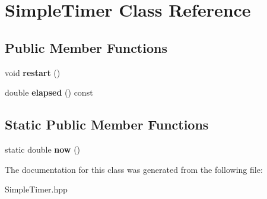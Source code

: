 \hypertarget{classSimpleTimer}{
\section{SimpleTimer Class Reference}
\label{classSimpleTimer}
}
\subsection*{Public Member Functions}
\begin{DoxyCompactItemize}
\item 
\hypertarget{classSimpleTimer_ab46a9a774391760865df2d1c88d777cc}{
void {\bfseries restart} ()}
\label{classSimpleTimer_ab46a9a774391760865df2d1c88d777cc}

\item 
\hypertarget{classSimpleTimer_af4319404e506317898cce1d17b61be32}{
double {\bfseries elapsed} () const }
\label{classSimpleTimer_af4319404e506317898cce1d17b61be32}

\end{DoxyCompactItemize}
\subsection*{Static Public Member Functions}
\begin{DoxyCompactItemize}
\item 
\hypertarget{classSimpleTimer_a29a1e9d827950cb2471b15da06c0d1d1}{
static double {\bfseries now} ()}
\label{classSimpleTimer_a29a1e9d827950cb2471b15da06c0d1d1}

\end{DoxyCompactItemize}


The documentation for this class was generated from the following file:\begin{DoxyCompactItemize}
\item 
SimpleTimer.hpp\end{DoxyCompactItemize}
